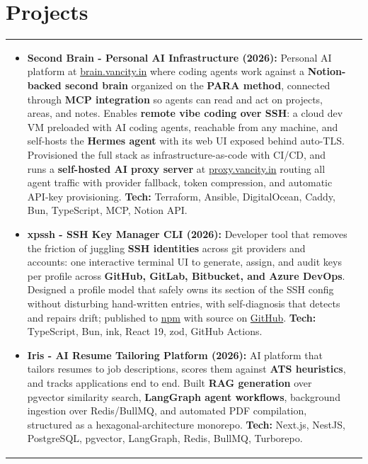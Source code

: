 \documentclass[a4paper,8pt]{article}
\begin{document}
\section{Projects}
\begin{tabularx}{\linewidth}{ @{}l r@{} }
\begin{minipage}[t]{\linewidth}
    \begin{itemize}[nosep,after=\strut, leftmargin=2em, itemsep=2pt]
        \item \textbf{Second Brain - Personal AI Infrastructure (2026):} Personal AI platform at \href{https://brain.vancity.in}{brain.vancity.in} where coding agents work against a \textbf{Notion-backed second brain} organized on the \textbf{PARA method}, connected through \textbf{MCP integration} so agents can read and act on projects, areas, and notes. Enables \textbf{remote vibe coding over SSH}: a cloud dev VM preloaded with AI coding agents, reachable from any machine, and self-hosts the \textbf{Hermes agent} with its web UI exposed behind auto-TLS. Provisioned the full stack as infrastructure-as-code with CI/CD, and runs a \textbf{self-hosted AI proxy server} at \href{https://proxy.vancity.in}{proxy.vancity.in} routing all agent traffic with provider fallback, token compression, and automatic API-key provisioning. \textbf{Tech:} Terraform, Ansible, DigitalOcean, Caddy, Bun, TypeScript, MCP, Notion API.
        \item \textbf{xpssh - SSH Key Manager CLI (2026):} Developer tool that removes the friction of juggling \textbf{SSH identities} across git providers and accounts: one interactive terminal UI to generate, assign, and audit keys per profile across \textbf{GitHub, GitLab, Bitbucket, and Azure DevOps}. Designed a profile model that safely owns its section of the SSH config without disturbing hand-written entries, with self-diagnosis that detects and repairs drift; published to \href{https://www.npmjs.com/package/xpssh-cli}{npm} with source on \href{https://github.com/vancityAyush/xpssh}{GitHub}. \textbf{Tech:} TypeScript, Bun, ink, React 19, zod, GitHub Actions.
        \item \textbf{Iris - AI Resume Tailoring Platform (2026):} AI platform that tailors resumes to job descriptions, scores them against \textbf{ATS heuristics}, and tracks applications end to end. Built \textbf{RAG generation} over pgvector similarity search, \textbf{LangGraph agent workflows}, background ingestion over Redis/BullMQ, and automated PDF compilation, structured as a hexagonal-architecture monorepo. \textbf{Tech:} Next.js, NestJS, PostgreSQL, pgvector, LangGraph, Redis, BullMQ, Turborepo.
    \end{itemize}
    \end{minipage}
\end{tabularx}\\[3pt]
\end{document}
